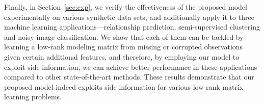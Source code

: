 \documentclass[twoside,11pt]{article}
\begin{document}
Finally, in Section~\ref{sec:exp},
we verify the effectiveness of the proposed model experimentally
on various synthetic data sets, and additionally apply it to
three machine learning applications---relationship prediction, semi-supervised
clustering and noisy image classification.  We show that each of them
can be tackled by learning a low-rank modeling matrix from missing or corrupted
observations given certain additional features, and therefore, by
employing our model to exploit side information, we can achieve
better performance in these applications compared to other state-of-the-art methods.
These results demonstrate that our proposed model indeed
exploits side information for various low-rank matrix learning problems.
\end{document}
